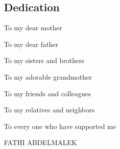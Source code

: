 \newenvironment{dedication}
{
	\thispagestyle{empty}
	\vspace*{\stretch{1}}
	\itshape
	\raggedleft
}
{\par
	\vspace{\stretch{3}}
	\clearpage
}
\begin{center}
	\section*{Dedication}
\end{center}
\begin{dedication}
	To my dear mother
	
	To my dear father
	
	To my sisters and brothers
	
	To my adorable grandmother
	
	To my friends and colleagues
	
	To my relatives and neighbors
	
	To every one who have supported me
	\par
	\vspace{2\baselineskip}
	
	\vspace{\baselineskip}
	FATHI ABDELMALEK
\end{dedication}